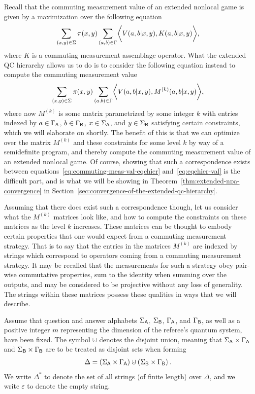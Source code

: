 Recall that the commuting measurement value of an extended nonlocal game is given by a maximization over the following equation
\begin{align} \label{eq:commuting-meas-val-eqchier}
	\sum_{(x,y) \in \Sigma} \pi(x,y) \sum_{(a,b) \in \Gamma} \biggl\langle V(a,b|x,y), K(a,b|x,y) \biggr\rangle,
\end{align}
where $K$ is a commuting measurement assemblage operator. What the extended QC hierarchy allows us to do is to consider the following equation instead to compute the commuting measurement value
\begin{align} \label{eq:eqchier-val}
	\sum_{(x,y) \in \Sigma} \pi(x,y) \sum_{(a,b) \in \Gamma} \biggl\langle V(a,b|x,y), M^{(k)}(a,b|x,y) \biggr\rangle,
\end{align}
where now $M^{(k)}$ is some matrix parametrized by some integer $k$ with entries indexed by $a \in \Gamma_{\mathsf{A}}$, $b \in \Gamma_{\mathsf{B}}$, $x \in \Sigma_{\mathsf{A}}$, and $y \in \Sigma_{\mathsf{B}}$ satisfying certain constraints, which we will elaborate on shortly. The benefit of this is that we can optimize over the matrix $M^{(k)}$ and these constraints for some level $k$ by way of a semidefinite program, and thereby compute the commuting measurement value of an extended nonlocal game. Of course, showing that such a correspondence exists between equations~\eqref{eq:commuting-meas-val-eqchier} and~\eqref{eq:eqchier-val} is the difficult part, and is what we will be showing in Theorem~\ref{thm:extended-npa-convergence} in Section~\ref{sec:convergence-of-the-extended-qc-hierarchy}. 

Assuming that there does exist such a correspondence though, let us consider what the $M^{(k)}$ matrices look like, and how to compute the constraints on these matrices as the level $k$ increases. These matrices can be thought to embody certain properties that one would expect from a commuting measurement strategy. That is to say that the entries in the matrices $M^{(k)}$ are indexed by strings which correspond to operators coming from a commuting measurement strategy. It may be recalled that the measurements for such a strategy obey pair-wise commutative properties, sum to the identity when summing over the outputs, and may be considered to be projective without any loss of generality. The strings within these matrices possess these qualities in ways that we will describe. 

Assume that question and answer alphabets $\Sigma_{\mathsf{A}}$, $\Sigma_{\mathsf{B}}$, $\Gamma_{\mathsf{A}}$, and
$\Gamma_{\mathsf{B}}$, as well as a positive integer $m$ representing the dimension of the
referee's quantum system, have been fixed. The symbol $\cupdot$ denotes the disjoint union, meaning that $\Sigma_{\mathsf{A}} \times \Gamma_{\mathsf{A}}$ and
$\Sigma_{\mathsf{B}} \times \Gamma_{\mathsf{B}}$ are to be treated as disjoint sets when forming
\begin{align}
\Delta = \left( \SigmaA \times \GammaA \right) \cupdot \left( \SigmaB \times \GammaB \right).
\end{align}
We write $\Delta^{\ast}$ to denote the set of all strings (of finite length) over
$\Delta$, and we write $\varepsilon$ to denote the empty string.

